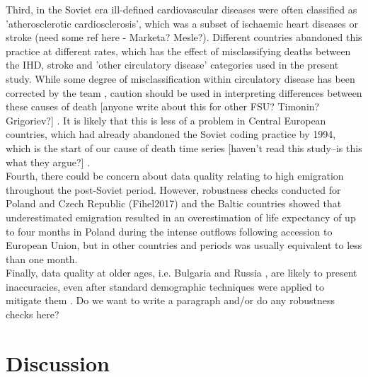 \documentclass{article}
\begin{document}
\begin{spacing}{1.5}
\textcolor[rgb]{1,0,0}{Third, in the Soviet era ill-defined cardiovascular diseases were often classified as 'atherosclerotic cardiosclerosis', which was a subset of ischaemic heart diseases \citep{jasilionis2011,shkolnikov2012data} or stroke (need some ref here - Marketa? Mesle?). Different countries abandoned this practice at different rates, which has the effect of misclassifying deaths between the IHD, stroke and 'other circulatory disease' categories used in the present study. While some degree of misclassification within circulatory disease has been corrected by the \citet{HcO} team \citep{Pechholdova2017}, caution should be used in interpreting differences between these causes of death [anyone write about this for other FSU? Timonin? Grigoriev?] \citep{jasilionis2011}. It is likely that this is less of a problem in Central European countries, which had already abandoned the Soviet coding practice by 1994, which is the start of our cause of death time series [haven't read this study--is this what they argue?] \citep{zatonski1998ecological}}. \\

\textcolor[rgb]{1,0,0}{Fourth, there could be concern about data quality relating to high emigration throughout the post-Soviet period. However, robustness checks conducted for Poland and Czech Republic (Fihel2017) and the Baltic countries \citep{jasilionis2011} showed that underestimated emigration resulted in an overestimation of life expectancy of up to four months in Poland during the intense outflows following accession to European Union, but in other countries and periods was usually equivalent to less than one month.} \\

\textcolor[rgb]{1,0,0}{Finally, data quality at older ages, i.e. Bulgaria and Russia \citep{timonin2017}, are likely to present inaccuracies, even after standard demographic techniques were applied to mitigate them \cite{HMD}. Do we want to write a paragraph and/or do any robustness checks here?}\\


\section*{Discussion}


\end{spacing}
\end{document}
